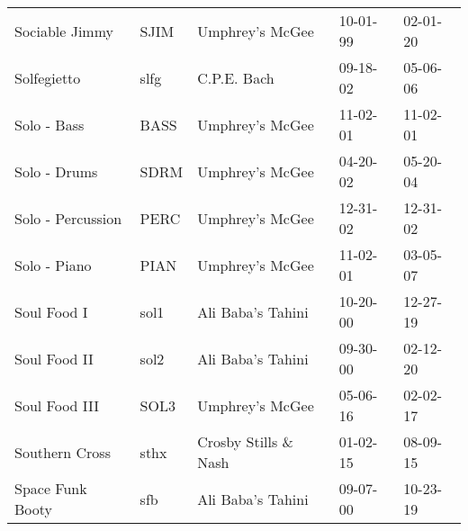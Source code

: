 \begin{longtable}{p{}p{}p{}p{}p{}}
                                                          Sociable Jimmy &          SJIM &                                          Umphrey's McGee &              10-01-99 &             02-01-20 \\
                                                             Solfegietto &          slfg &                                              C.P.E. Bach &              09-18-02 &             05-06-06 \\
                                                             Solo - Bass &          BASS &                                          Umphrey's McGee &              11-02-01 &             11-02-01 \\
                                                            Solo - Drums &          SDRM &                                          Umphrey's McGee &              04-20-02 &             05-20-04 \\
                                                       Solo - Percussion &          PERC &                                          Umphrey's McGee &              12-31-02 &             12-31-02 \\
                                                            Solo - Piano &          PIAN &                                          Umphrey's McGee &              11-02-01 &             03-05-07 \\
                                                             Soul Food I &          sol1 &                                        Ali Baba's Tahini &              10-20-00 &             12-27-19 \\
                                                            Soul Food II &          sol2 &                                        Ali Baba's Tahini &              09-30-00 &             02-12-20 \\
                                                           Soul Food III &          SOL3 &                                          Umphrey's McGee &              05-06-16 &             02-02-17 \\
                                                          Southern Cross &          sthx &                                    Crosby Stills \& Nash &              01-02-15 &             08-09-15 \\
                                                        Space Funk Booty &           sfb &                                        Ali Baba's Tahini &              09-07-00 &             10-23-19 \\

\end{longtable}
